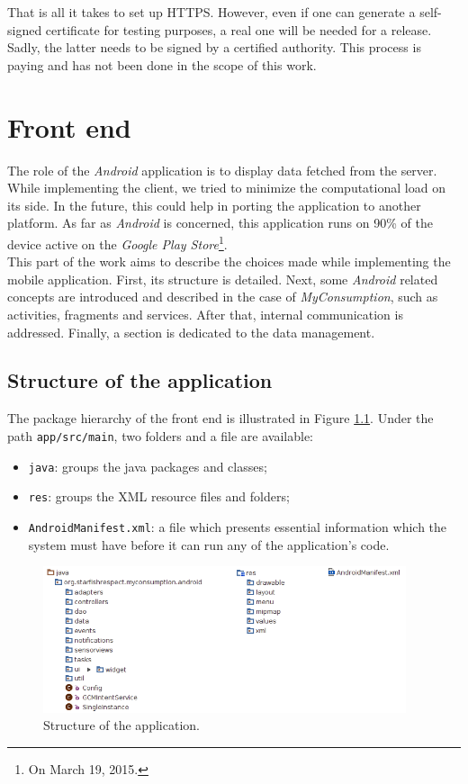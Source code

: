 \documentclass[a4paper, oneside, 11pt]{book}
\begin{document}
That is all it takes to set up HTTPS. However, even if one can generate a self-signed certificate for testing purposes, a real one will be needed for a release. Sadly, the latter needs to be signed by a certified authority. This process is paying and has not been done in the scope of this work.

\chapter{Front end}
The role of the \textit{Android} application is to display data fetched from the server. While implementing the client, we tried to minimize the computational load on its side. In the future, this could help in porting the application to another platform. As far as \textit{Android} is concerned, this application runs on 90\% of the device active on the \textit{Google Play Store}\footnote{On  March 19, 2015.}.\\

This part of the work aims to describe the choices made while implementing the mobile application. First, its structure is detailed. Next, some \textit{Android} related concepts are introduced and described in the case of \textit{MyConsumption}, such as activities, fragments and services. After that, internal communication is addressed. Finally, a section is dedicated to the data management.

\section{Structure of the application}
The  package hierarchy of the front end is illustrated in Figure \ref{fig:front_end_struct}. Under the path \texttt{app/src/main}, two folders and a file are available: 

\begin{itemize}
	\item \texttt{java}: groups the java packages and classes;
	\item \texttt{res}: groups the XML resource files and folders;
	\item \texttt{AndroidManifest.xml}: a file which presents essential information which the system must have before it can run any of the application's code.
\end{itemize}

\begin{figure}[htbp]
	\centerline{\includegraphics[width=0.95\textwidth]{front_end_struct.png}}
	\caption{Structure of the application.}
	\label{fig:front_end_struct}
\end{figure}
\end{document}
